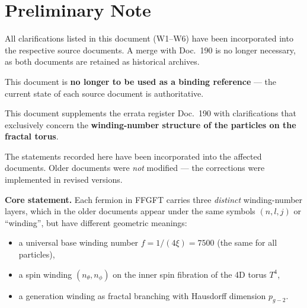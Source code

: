 
\section*{Preliminary Note}

\begin{tcolorbox}[colback=green!5!white, colframe=green!50!black, title={Status: Fully incorporated — May 2026}]
All clarifications listed in this document (W1–W6) have been
incorporated into the respective source documents. A merge with
Doc.~190 is no longer necessary, as both documents are retained
as historical archives.

This document is \textbf{no longer to be used as a binding reference}
— the current state of each source document is authoritative.
\end{tcolorbox}

\bigskip

This document supplements the errata register Doc.~190 with
clarifications that exclusively concern the \textbf{winding-number
structure of the particles on the fractal torus}.

The statements recorded here have been incorporated into the affected
documents. Older documents were \emph{not} modified — the corrections
were implemented in revised versions.

\bigskip

\textbf{Core statement.} Each fermion in FFGFT carries three
\emph{distinct} winding-number layers, which in the older documents
appear under the same symbols $(n,l,j)$ or \enquote{winding}, but
have different geometric meanings:

\begin{itemize}
  \item a universal base winding number $f = 1/(4\xi) = 7500$
        (the same for all particles),
  \item a spin winding $(n_\theta, n_\phi)$ on the inner spin
        fibration of the 4D torus $T^4$,
  \item a generation winding as fractal branching with
        Hausdorff dimension $p_{g\!-\!2}$.
\end{itemize}

